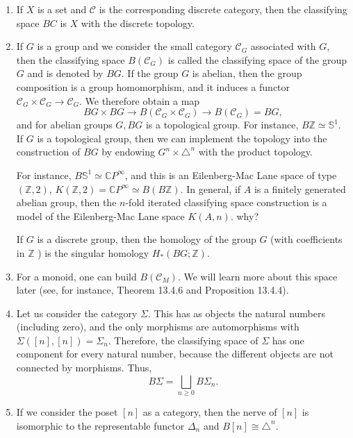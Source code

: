 \begin{example}
    \begin{enumerate}
        \item If $X$ is a set and $\mathcal{C}$ is the corresponding discrete category, then the classifying space $B C$ is $X$ with the discrete topology.
        \item If $G$ is a group and we consider the small category $\mathcal{C}_G$ associated with $G$, then the classifying space $B\left(\mathcal{C}_G\right)$ is called the classifying space of the group $G$ and is denoted by $B G$. If the group $G$ is abelian, then the group composition is a group homomorphism, and it induces a functor $\mathcal{C}_G \times \mathcal{C}_G \rightarrow \mathcal{C}_G$. We therefore obtain a map
        $$
        B G \times B G \rightarrow B\left(\mathcal{C}_G \times \mathcal{C}_G\right) \rightarrow B\left(\mathcal{C}_G\right)=B G,
        $$
        and for abelian groups $G, B G$ is a topological group. For instance, $B \mathbb{Z} \simeq \mathbb{S}^1$.
        If $G$ is a topological group, then we can implement the topology into the construction of $B G$ by endowing $G^n \times \triangle^n$ with the product topology.
        
        For instance, $B \mathbb{S}^1 \simeq \mathbb{C} P^{\infty}$, and this is an Eilenberg-Mac Lane space of type $(\mathbb{Z}, 2)$, $K(\mathbb{Z}, 2)=\mathbb{C} P^{\infty} \simeq B(B \mathbb{Z})$. In general, if $A$ is a finitely generated abelian group, then the $n$-fold iterated classifying space construction is a model of the Eilenberg-Mac Lane space $K(A, n)$. { why?}
        
        If $G$ is a discrete group, then the homology of the group $G$ (with coefficients in $\mathbb{Z}$ ) is the singular homology $H_*(B G ; \mathbb{Z})$.
        \item For a monoid, one can build $B\left(\mathcal{C}_M\right)$. We will learn more about this space later (see, for instance, Theorem 13.4.6 and Proposition 13.4.4).
        \item Let us consider the category $\Sigma$. This has as objects the natural numbers (including zero), and the only morphisms are automorphisms with $\Sigma([n],[n])=\Sigma_n$. Therefore, the classifying space of $\Sigma$ has one component for every natural number, because the different objects are not connected by morphisms. Thus,
        $$
        B \Sigma=\bigsqcup_{n \geq 0} B \Sigma_n .
        $$
        
        \item If we consider the poset $[n]$ as a category, then the nerve of $[n]$ is isomorphic to the representable functor $\Delta_n$ and $B[n] \cong \triangle^n$.
    \end{enumerate}
\end{example}

